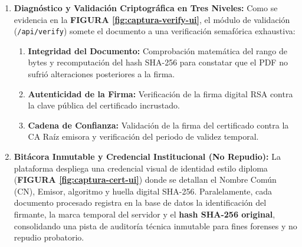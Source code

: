 \begin{enumerate}

  \item \textbf{Diagnóstico y Validación Criptográfica en Tres Niveles:} Como se evidencia en la \textbf{FIGURA \ref{fig:captura-verify-ui}}, el módulo de validación (\texttt{/api/verify}) somete el documento a una verificación semafórica exhaustiva:
  \begin{enumerate}[label=\alph*)]
    \item \textbf{Integridad del Documento:} Comprobación matemática del rango de bytes y recomputación del hash SHA-256 para constatar que el PDF no sufrió alteraciones posteriores a la firma.
    \item \textbf{Autenticidad de la Firma:} Verificación de la firma digital RSA contra la clave pública del certificado incrustado.
    \item \textbf{Cadena de Confianza:} Validación de la firma del certificado contra la CA Raíz emisora y verificación del periodo de validez temporal.
  \end{enumerate}


  \item \textbf{Bitácora Inmutable y Credencial Institucional (No Repudio):} La plataforma despliega una credencial visual de identidad estilo diploma (\textbf{FIGURA \ref{fig:captura-cert-ui}}) donde se detallan el Nombre Común (CN), Emisor, algoritmo y huella digital SHA-256. Paralelamente, cada documento procesado registra en la base de datos la identificación del firmante, la marca temporal del servidor y el \textbf{hash SHA-256 original}, consolidando una pista de auditoría técnica inmutable para fines forenses y no repudio probatorio.
\end{enumerate}

